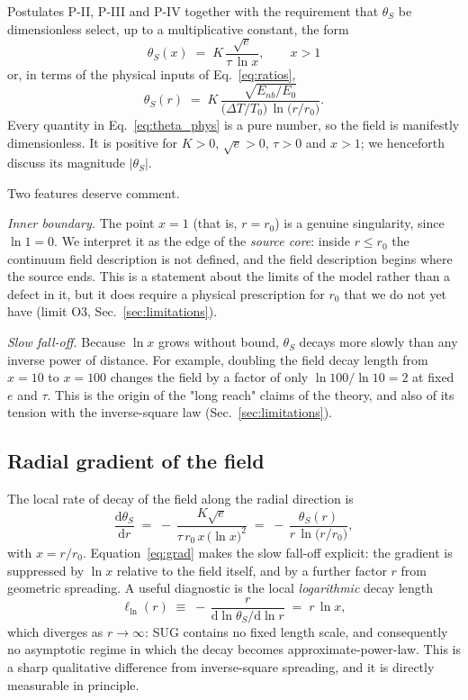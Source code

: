 \documentclass[11pt,a4paper]{article}
\newcommand{\thetaS}{\theta_{S}}
\newcommand{\dd}{\mathrm{d}}
\newcommand{\tgrad}{\tau}
\begin{document}
Postulates P-II, P-III and P-IV together with the requirement that
$\thetaS$ be dimensionless select, up to a multiplicative constant, the form
\begin{equation}
  \boxed{\; \thetaS(x) \;=\; K\,\frac{\sqrt{e}}{\tgrad\,\ln x} , \qquad x > 1 \;}
  \label{eq:theta}
\end{equation}
or, in terms of the physical inputs of Eq.~\eqref{eq:ratios},
\begin{equation}
  \thetaS(r) \;=\;
  K\,\frac{\sqrt{E_{nb}/E_0}}
  {\bigl(\Delta T/T_0\bigr)\,\ln\!\bigl(r/r_0\bigr)} .
  \label{eq:theta_phys}
\end{equation}
Every quantity in Eq.~\eqref{eq:theta_phys} is a pure number, so the field is
manifestly dimensionless. It is positive for $K>0$, $\sqrt{e}>0$, $\tgrad>0$ and
$x>1$; we henceforth discuss its magnitude $\lvert\thetaS\rvert$.

Two features deserve comment.

\emph{Inner boundary.} The point $x=1$ (that is, $r=r_0$) is a genuine
singularity, since $\ln 1 = 0$. We interpret it as the edge of the
\emph{source core}: inside $r\le r_0$ the continuum field description is not
defined, and the field description begins where the source ends. This is a
statement about the limits of the model rather than a defect in it, but it
does require a physical prescription for $r_0$ that we do not yet have
(limit O3, Sec.~\ref{sec:limitations}).

\emph{Slow fall-off.} Because $\ln x$ grows without bound, $\thetaS$ decays
more slowly than any inverse power of distance. For example, doubling the
field decay length from $x=10$ to $x=100$ changes the field by a factor of
only $\ln 100/\ln 10 = 2$ at fixed $e$ and $\tgrad$. This is the origin of the
"long reach" claims of the theory, and also of its tension with the
inverse-square law (Sec.~\ref{sec:limitations}).

\subsection{Radial gradient of the field}
\label{sec:gradient}

The local rate of decay of the field along the radial direction is
\begin{equation}
  \frac{\dd\thetaS}{\dd r}
  \;=\; -\,\frac{K\sqrt{e}}{\tgrad\,r_0\,x\,\bigl(\ln x\bigr)^{2}}
  \;=\; -\,\frac{\thetaS(r)}{r\,\ln\!\bigl(r/r_0\bigr)} ,
  \label{eq:grad}
\end{equation}
with $x=r/r_0$. Equation~\eqref{eq:grad} makes the slow fall-off explicit:
the gradient is suppressed by $\ln x$ relative to the field itself, and by a
further factor $r$ from geometric spreading. A useful diagnostic is the local
\emph{logarithmic} decay length
\begin{equation}
  \ell_{\ln}(r) \;\equiv\; -\,\frac{r}{\dd\ln\thetaS/\dd\ln r}
  \;=\; r\,\ln x ,
\end{equation}
which diverges as $r\to\infty$: SUG contains no fixed length scale, and
consequently no asymptotic regime in which the decay becomes
approximate-power-law. This is a sharp qualitative difference from
inverse-square spreading, and it is directly measurable in principle.
\end{document}
